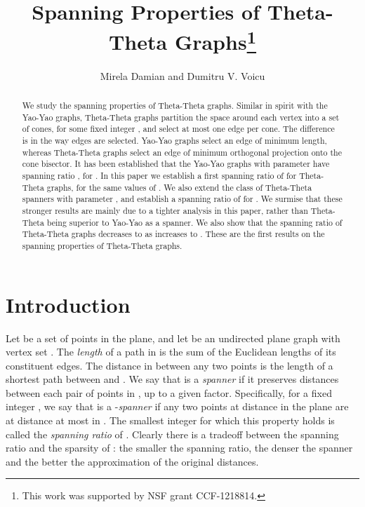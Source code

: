 \documentclass[runningheads,a4paper]{llncs}
\begin{document}
\mainmatter  

\title{Spanning Properties of Theta-Theta Graphs\thanks{This work was supported by NSF grant CCF-1218814.}}

\author{Mirela Damian and Dumitru V. Voicu}


\date{}

\maketitle

\begin{abstract}
We study the spanning properties of Theta-Theta graphs. Similar in spirit with the Yao-Yao graphs, Theta-Theta graphs partition the space around each vertex into a set of  cones, for some fixed integer , and select at most one edge per cone. The difference is in the way edges are selected. Yao-Yao graphs select an edge of minimum length, whereas Theta-Theta graphs select an edge of minimum orthogonal projection onto the cone bisector. It has been established that the Yao-Yao graphs with parameter  have spanning ratio , for . In this paper we establish a first spanning ratio of  for Theta-Theta graphs, for the same values of . We also extend the class of Theta-Theta spanners with parameter , and establish a spanning ratio of  for . We surmise that these stronger results are mainly due to a tighter analysis in this paper, rather than Theta-Theta being superior to Yao-Yao as a spanner. We also show that the spanning ratio of Theta-Theta graphs decreases to  as  increases to .  These are the first results on the spanning properties of Theta-Theta graphs. 
\end{abstract}

\section{Introduction}
Let  be a set of  points in the plane, and let  be an undirected plane graph with vertex set . The \emph{length} of a path in  is the sum of the Euclidean lengths of its constituent edges. The distance in  between any two points  is the length of a shortest path between  and . We say that  is a \emph{spanner} if it preserves distances between each pair of points in , up to a given factor. Specifically, for a fixed integer , we say that  is a -\emph{spanner} if any two points  at distance  in the plane are at distance at most  in . The smallest integer  for which this property holds is called the \emph{spanning ratio} of . Clearly there is a tradeoff between the spanning ratio and the sparsity of : the smaller the spanning ratio, the denser the spanner and the better the approximation of the original distances. 
\end{document}
